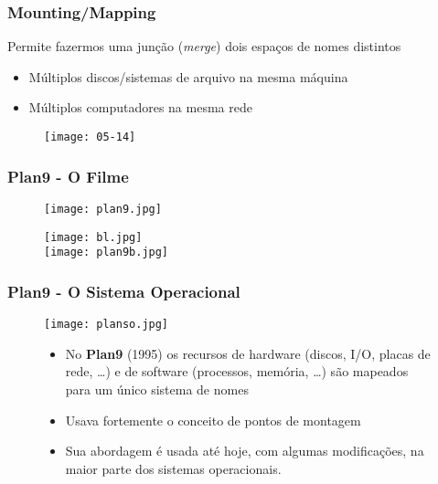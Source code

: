 \documentclass[Ligatures=TeX,table,brazil,svgnames,usetotalslideindicator,compress,10pt]{beamer}
\begin{document}
\begin{frame}
  \frametitle{Mounting/Mapping}
  Permite fazermos uma \alert{junção} (\emph{merge}) dois espaços de nomes distintos
  \begin{itemize}
  \item Múltiplos discos/sistemas de arquivo na mesma máquina
  \item Múltiplos computadores na mesma rede
  \end{itemize}
  \begin{figure}
    \centering
    \texttt{[image: 05-14]}
  \end{figure}

\end{frame}

\begin{frame}
  \frametitle{Plan9 - O Filme}

  \begin{figure}
    \centering
    \begin{minipage}{0.45\textwidth}
      \centering
        \texttt{[image: plan9.jpg]}
    \end{minipage}\hfill
    \begin{minipage}{0.45\textwidth}
        \centering
        \texttt{[image: bl.jpg]}\\
        \texttt{[image: plan9b.jpg]}
    \end{minipage}
  \end{figure}

\end{frame}

\begin{frame}
  \frametitle{Plan9 - O Sistema Operacional}
  \begin{figure}
    \centering
    \begin{minipage}{0.3\textwidth}
      \centering
      \texttt{[image: planso.jpg]}
    \end{minipage}\hfill
    \begin{minipage}{0.65\textwidth}
      \centering
      \begin{itemize}
      \item No \textbf{Plan9} (1995) os recursos de hardware (discos,
        I/O, placas de rede, \ldots) e de software (processos,
        memória, \ldots) são \alert{mapeados para um único sistema de
          nomes}
      \item Usava fortemente o conceito de pontos de montagem
      \item Sua abordagem é usada até hoje, com algumas modificações,
        na maior parte dos sistemas operacionais.
      \end{itemize}
    \end{minipage}
  \end{figure}

\end{frame}
\end{document}
